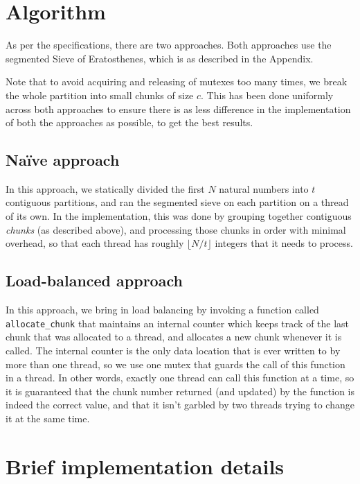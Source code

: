\documentclass[a4paper]{article}
\begin{document}
\section{Algorithm}

As per the specifications, there are two approaches. Both approaches use the segmented Sieve of Eratosthenes, which is as described in the Appendix.

Note that to avoid acquiring and releasing of mutexes too many times, we break the whole partition into small chunks of size $c$. This has been done uniformly across both approaches to ensure
there is as less difference in the implementation of both the approaches as possible, to get the best results.

\subsection{Na\"ive approach}

In this approach, we statically divided the first $N$ natural numbers into $t$ contiguous partitions, and ran the segmented sieve on each partition on a thread of its own. In the
implementation, this was done by grouping together contiguous \textit{chunks} (as described above), and processing those chunks in order with minimal overhead, so that each thread has roughly
$\lfloor N/t \rfloor$ integers that it needs to process.

\subsection{Load-balanced approach}

In this approach, we bring in load balancing by invoking a function called \texttt{allocate\_chunk} that maintains an internal counter which keeps track of the last chunk that was
allocated to a thread, and allocates a new chunk whenever it is called. The internal counter is the only data location that is ever written to by more than one thread, so we use one mutex that
guards the call of this function in a thread. In other words, exactly one thread can call this function at a time, so it is guaranteed that the chunk number returned (and updated) by the function
is indeed the correct value, and that it isn't garbled by two threads trying to change it at the same time.

\section{Brief implementation details}
\end{document}
